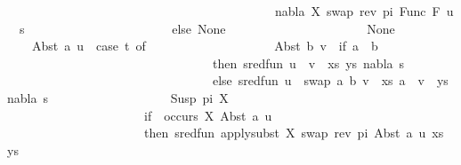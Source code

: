 \begin{isabellebody}
\ \ \ \ \ \ \ \ \ \ \ \ \ \ \ \ \ \ \ \ \ \ \ \ \ \ \ \ \ \ \ \ \ \ \ \ \ \ \ \ \ \ \ nabla{\isacharcomma}{\kern0pt}\ {\isacharbrackleft}{\kern0pt}{\isacharparenleft}{\kern0pt}X{\isacharcomma}{\kern0pt}\ swap\ {\isacharparenleft}{\kern0pt}rev\ pi{\isacharparenright}{\kern0pt}\ {\isacharparenleft}{\kern0pt}Func\ F\ u{\isacharparenright}{\kern0pt}{\isacharparenright}{\kern0pt}{\isacharbrackright}{\kern0pt}\ {\isasymbullet}\ s{\isacharparenright}{\kern0pt}\isanewline
\ \ \ \ \ \ \ \ \ \ \ \ \ \ \ \ \ \ \ \ \ \ \ else\ None\isanewline
\ \ \ \ \ \ \ \ \ \ \ \ \ \ \ \ \ \ \ {\isacharbar}{\kern0pt}\ {\isacharunderscore}{\kern0pt}\ {\isasymRightarrow}\ None{\isacharparenright}{\kern0pt}\isanewline
\ \ \ {\isacharbar}{\kern0pt}\ Abst\ a\ u\ {\isasymRightarrow}\ {\isacharparenleft}{\kern0pt}case\ t{}\ of\isanewline
\ \ \ \ \ \ \ \ \ \ \ \ \ \ \ \ \ \ \ \ Abst\ b\ v\ {\isasymRightarrow}\ if\ a\ {\isacharequal}{\kern0pt}\ b\isanewline
\ \ \ \ \ \ \ \ \ \ \ \ \ \ \ \ \ \ \ \ \ \ \ \ \ \ \ \ \ \ \ \ \ then\ sred{\isacharunderscore}{\kern0pt}fun\ {\isacharparenleft}{\kern0pt}{\isacharparenleft}{\kern0pt}{\isacharparenleft}{\kern0pt}u\ {\isasymapprox}{\isacharquery}{\kern0pt}\ v{\isacharparenright}{\kern0pt}\ {\isacharhash}{\kern0pt}\ xs{\isacharcomma}{\kern0pt}\ ys{\isacharparenright}{\kern0pt}{\isacharcomma}{\kern0pt}\ nabla{\isacharcomma}{\kern0pt}\ s{\isacharparenright}{\kern0pt}\isanewline
\ \ \ \ \ \ \ \ \ \ \ \ \ \ \ \ \ \ \ \ \ \ \ \ \ \ \ \ \ \ \ \ \ else\ sred{\isacharunderscore}{\kern0pt}fun\ {\isacharparenleft}{\kern0pt}{\isacharparenleft}{\kern0pt}{\isacharparenleft}{\kern0pt}u\ {\isasymapprox}{\isacharquery}{\kern0pt}\ swap\ {\isacharbrackleft}{\kern0pt}{\isacharparenleft}{\kern0pt}a{\isacharcomma}{\kern0pt}\ b{\isacharparenright}{\kern0pt}{\isacharbrackright}{\kern0pt}\ v{\isacharparenright}{\kern0pt}\ {\isacharhash}{\kern0pt}\ xs{\isacharcomma}{\kern0pt}\ {\isacharparenleft}{\kern0pt}a\ {\isasymsharp}{\isacharquery}{\kern0pt}\ v{\isacharparenright}{\kern0pt}\ {\isacharhash}{\kern0pt}\ ys{\isacharparenright}{\kern0pt}{\isacharcomma}{\kern0pt}\ nabla{\isacharcomma}{\kern0pt}\ s{\isacharparenright}{\kern0pt}\isanewline
\ \ \ \ \ \ \ \ \ \ \ \ \ \ \ \ \ \ {\isacharbar}{\kern0pt}\ Susp\ pi\ X\ {\isasymRightarrow}\isanewline
\ \ \ \ \ \ \ \ \ \ \ \ \ \ \ \ \ \ \ \ \ \ if\ {\isasymnot}\ occurs\ X\ {\isacharparenleft}{\kern0pt}Abst\ a\ u{\isacharparenright}{\kern0pt}\isanewline
\ \ \ \ \ \ \ \ \ \ \ \ \ \ \ \ \ \ \ \ \ \ then\ sred{\isacharunderscore}{\kern0pt}fun\ {\isacharparenleft}{\kern0pt}apply{\isacharunderscore}{\kern0pt}subst\ {\isacharbrackleft}{\kern0pt}{\isacharparenleft}{\kern0pt}X{\isacharcomma}{\kern0pt}\ swap\ {\isacharparenleft}{\kern0pt}rev\ pi{\isacharparenright}{\kern0pt}\ {\isacharparenleft}{\kern0pt}Abst\ a\ u{\isacharparenright}{\kern0pt}{\isacharparenright}{\kern0pt}{\isacharbrackright}{\kern0pt}\ {\isacharparenleft}{\kern0pt}xs{\isacharcomma}{\kern0pt}\ ys{\isacharparenright}{\kern0pt}{\isacharcomma}{\kern0pt}\isanewline

\end{isabellebody}
